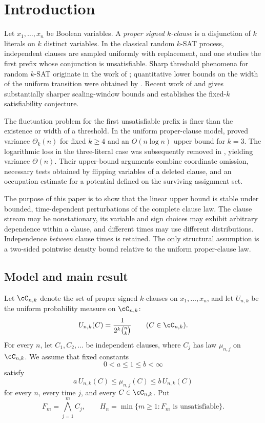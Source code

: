 \section{Introduction}
\label{sec:introduction}

Let $x_1,\dots,x_n$ be Boolean variables.  A \emph{proper signed
$k$-clause} is a disjunction of $k$ literals on $k$ distinct variables.
In the classical random $k$-SAT process, independent clauses are sampled
uniformly with replacement, and one studies the first prefix whose
conjunction is unsatisfiable.  Sharp threshold phenomena for random
$k$-SAT originate in the work of \citet{Friedgut1999}; quantitative lower
bounds on the width of the uniform transition were obtained by
\citet{Wilson2002}.  Recent work of \citet{Carenini2026Scaling} and
\citet{Carenini2026Polynomial} gives substantially sharper scaling-window
bounds and establishes the fixed-$k$ satisfiability conjecture.

The fluctuation problem for the first unsatisfiable prefix is finer than the
existence or width of a threshold.  In the uniform proper-clause model,
\citet{OpenAI2026KSATVariance} proved variance $\Theta_k(n)$ for fixed
$k\ge4$ and an $O(n\log n)$ upper bound for $k=3$.  The logarithmic loss in
the three-literal case was subsequently removed in
\citet{OpenAI2026ThreeSATVariance}, yielding variance $\Theta(n)$.  Their
upper-bound arguments combine coordinate omission, necessary tests obtained
by flipping variables of a deleted clause, and an occupation estimate for a
potential defined on the surviving assignment set.

The purpose of this paper is to show that the linear upper bound is stable
under bounded, time-dependent perturbations of the complete clause law.
The clause stream may be nonstationary, its variable and sign choices may
exhibit arbitrary dependence within a clause, and different times may use
different distributions.  Independence \emph{between} clause times is
retained.  The only structural assumption is a two-sided pointwise density
bound relative to the uniform proper-clause law.

\subsection{Model and main result}

Let $\cC_{n,k}$ denote the set of proper signed $k$-clauses on
$x_1,\dots,x_n$, and let $U_{n,k}$ be the uniform probability measure on
$\cC_{n,k}$:
\[
    U_{n,k}(C)=\frac{1}{2^k\binom nk}
    \qquad(C\in\cC_{n,k}).
\]
For every $n$, let $C_1,C_2,\dots$ be independent clauses, where $C_j$ has
law $\mu_{n,j}$ on $\cC_{n,k}$.  We assume that fixed constants
\[
    0<a\le 1\le b<\infty
\]
satisfy
\begin{equation}
    a\,U_{n,k}(C)
    \le \mu_{n,j}(C)
    \le b\,U_{n,k}(C)
    \label{eq:uniform-comparability}
\end{equation}
for every $n$, every time $j$, and every $C\in\cC_{n,k}$.  Put
\[
    F_m=\bigwedge_{j=1}^m C_j,
    \qquad
    H_n=\min\{m\ge1:F_m\text{ is unsatisfiable}\}.
\]

